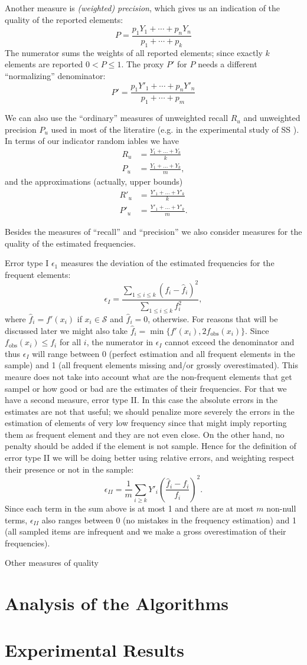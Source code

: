 \documentclass{article}
\begin{document}
Another measure is \emph{(weighted) precision}, which gives us an indication
of the quality of the reported elements:
\[
P = \frac{p_1 Y_1+\cdots+p_n Y_n}{p_1+\cdots+p_k}
\]
The numerator sums the weights of all reported elements; since exactly
$k$ elements are reported $0 < P\le 1$. The proxy $P'$ for $P$
needs a different ``normalizing'' denominator:
\[
P' = \frac{p_1 Y'_1+\cdots+p_n Y'_n}{p_1+\cdots+p_m}
\]

We can also use the ``ordinary'' measures of unweighted recall $R_u$ and
unweighted precision $P_u$ used in most of the literatire (e.g. in the
experimental study of SS \cite{}). In terms of our indicator random iables
we have
\begin{align*}
  R_u &= \frac{Y_1+\ldots+Y_k}{k} \\
  P_u &= \frac{Y_1+\ldots+Y_k}{m},
\end{align*}
and the approximations (actually, upper bounds)
\begin{align*}
  R'_u &= \frac{Y'_1+\ldots+Y'_k}{k} \\
  P'_u &= \frac{Y'_1+\ldots+Y'_k}{m}.
\end{align*}

Besides the measures of ``recall'' and ``precision'' we also consider
measures for the quality of the estimated frequencies.

Error type I $\epsilon_1$ measures the deviation of the estimated
frequencies for the frequent elements:
\[
\epsilon_I = \frac{\sum_{1\le i\le k} (f_i-\hat{f}_i)^2}{\sum_{1\le i\le k} f_i^2},
\]
where $\hat{f}_i=f'(x_i)$ if $x_i\in\mathcal{S}$ and $\hat{f}_i=0$, otherwise.
For reasons that will be discussed later we might also take
$\hat{f}_i=\min\{f'(x_i),2f_\text{obs}(x_i)\}$. Since $f_\text{obs}(x_i)\le f_i$
for all $i$, the numerator in $\epsilon_I$ cannot exceed the denominator
and thus $\epsilon_I$ will range between 0 (perfect estimation and all frequent
elements in the sample) and 1 (all frequent elements missing and/or
grossly overestimated). This meaure does not take into account what are
the non-frequent elements that get sampel or how good or bad are the
estimates of their frequencies. For that we have a second measure,
error type II. In this case the absolute errors in the estimates are
not that useful; we should penalize more severely the errors in the
estimation of elements of very low frequency since that might
imply reporting them as frequent element and they are not even close. On the
other hand, no penalty should be added if the element is not sample.
Hence for the definition of error type II we will be doing better using relative
errors, and weighting respect their presence or not in the sample:
\[
\epsilon_{II}=\frac{1}{m}
\sum_{i\ge k} Y'_i\left(\frac{\hat{f}_i-f_i}{f_i}\right)^2.
\]
Since each term in the sum above is at most 1 and there are at most $m$
non-null terms, $\epsilon_{II}$ also ranges between 0 (no mistakes in the
frequency estimation) and 1 (all sampled items are infrequent and we make
a gross overestimation of their frequencies).

{\color{red} Other measures of quality}

\section{Analysis of the Algorithms}

\section{Experimental Results}
\end{document}
